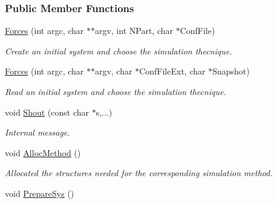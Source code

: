 \subsubsection*{Public Member Functions}
\begin{DoxyCompactItemize}
\item 
\hyperlink{classForces_a0b40ef47e7e825a72223abc459561c10}{Forces} (int argc, char $\ast$$\ast$argv, int N\+Part, char $\ast$Conf\+File)\hypertarget{classForces_a0b40ef47e7e825a72223abc459561c10}{}\label{classForces_a0b40ef47e7e825a72223abc459561c10}

\begin{DoxyCompactList}\small\item\em Create an initial system and choose the simulation thecnique. \end{DoxyCompactList}\item 
\hyperlink{classForces_abbcd2fc791d4ded94db5172ef1000e42}{Forces} (int argc, char $\ast$$\ast$argv, char $\ast$Conf\+File\+Ext, char $\ast$Snapshot)\hypertarget{classForces_abbcd2fc791d4ded94db5172ef1000e42}{}\label{classForces_abbcd2fc791d4ded94db5172ef1000e42}

\begin{DoxyCompactList}\small\item\em Read an initial system and choose the simulation thecnique. \end{DoxyCompactList}\item 
void \hyperlink{classForces_ac11429f7ec42e6eb4806e77f8aa24e7f}{Shout} (const char $\ast$s,...)\hypertarget{classForces_ac11429f7ec42e6eb4806e77f8aa24e7f}{}\label{classForces_ac11429f7ec42e6eb4806e77f8aa24e7f}

\begin{DoxyCompactList}\small\item\em Internal message. \end{DoxyCompactList}\item 
void \hyperlink{classForces_aa7040ce5b212b067b9edc0e48966f593}{Alloc\+Method} ()\hypertarget{classForces_aa7040ce5b212b067b9edc0e48966f593}{}\label{classForces_aa7040ce5b212b067b9edc0e48966f593}

\begin{DoxyCompactList}\small\item\em Allocated the structures needed for the corresponding simulation method. \end{DoxyCompactList}\item 
void \hyperlink{classForces_a053a9be7328b6a532baf8774f8479188}{Prepare\+Sys} ()\hypertarget{classForces_a053a9be7328b6a532baf8774f8479188}{}\label{classForces_a053a9be7328b6a532baf8774f8479188}


\end{DoxyCompactItemize}
